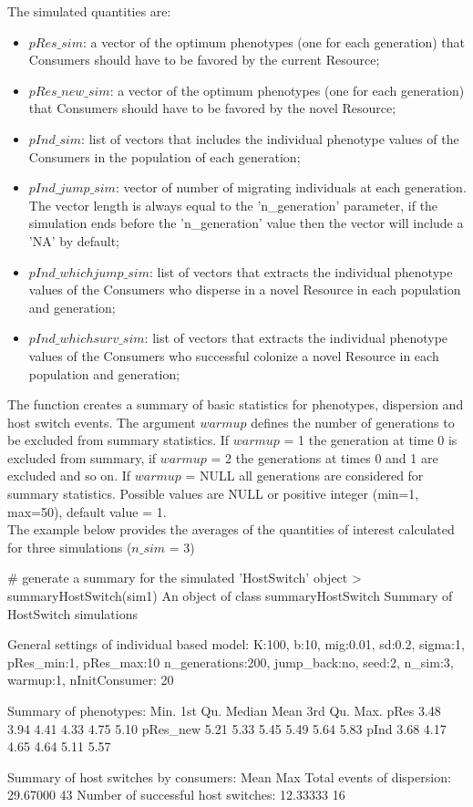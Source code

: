 The simulated quantities are:
\begin{itemize}
 \item $pRes\_sim$: a vector of the optimum phenotypes (one for each generation) that Consumers should have to be favored by the current Resource;
 \item $pRes\_new\_sim$: a vector of the optimum phenotypes (one for each generation) that Consumers should have to be favored by the novel Resource;
 \item $pInd\_sim$: list of vectors that includes the individual phenotype values of the Consumers in the population of each generation;
 \item $pInd\_jump\_sim$: vector of number of migrating individuals at each generation. The vector length is always equal to the 'n\_generation' parameter, if the simulation ends before the 'n\_generation' value then the vector will include a 'NA' by default;
 \item $pInd\_whichjump\_sim$: list of vectors that extracts the individual phenotype values of the Consumers who disperse in a novel Resource in each population and generation;
 \item $pInd\_whichsurv\_sim$: list of vectors that extracts the individual phenotype values of the Consumers who successful colonize a novel Resource in each population and generation;
\end{itemize}
The function  creates a summary of basic statistics for phenotypes, dispersion and host switch events. The argument $warmup$ defines the number of generations to be excluded from summary statistics. If $warmup$ = 1 the generation at time 0 is excluded from summary, if $warmup$ = 2 the generations at times 0 and 1 are excluded and so on. If $warmup$ = NULL all generations are considered for summary statistics. Possible values are NULL or positive integer (min=1, max=50), default value = 1.\\
The example below provides the averages of the quantities of interest calculated for three simulations ($n\_sim$ = 3)

\begin{example}
  # generate a summary for the simulated 'HostSwitch' object
  > summaryHostSwitch(sim1)
  An object of class summaryHostSwitch
  Summary of HostSwitch simulations

  General settings of individual based model:
  K:100, b:10, mig:0.01, sd:0.2, sigma:1, pRes_min:1, pRes_max:10
  n_generations:200, jump_back:no, seed:2, n_sim:3, warmup:1, nInitConsumer: 20
 
  Summary of phenotypes:
           Min. 1st Qu. Median Mean 3rd Qu. Max.
  pRes     3.48    3.94   4.41 4.33    4.75 5.10
  pRes_new 5.21    5.33   5.45 5.49    5.64 5.83
  pInd     3.68    4.17   4.65 4.64    5.11 5.57

  Summary of host switches by consumers:
                                          Mean Max
  Total events of dispersion:         29.67000  43
  Number of successful host switches: 12.33333  16

\end{example}


